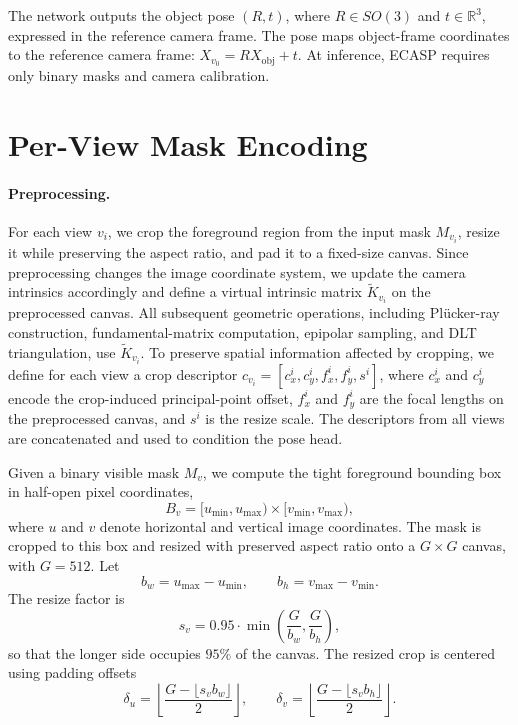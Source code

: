 The network outputs the object pose \((R,t)\), where \(R \in SO(3)\) and \(t \in \mathbb{R}^3\), expressed in the reference camera frame.
The pose maps object-frame coordinates to the reference camera frame: \(X_{v_0} = R X_{\mathrm{obj}} + t\).
At inference, ECASP requires only binary masks and camera calibration.

\section{Per-View Mask Encoding}
\label{sec:encoding}

\paragraph{Preprocessing.}
For each view \(v_i\), we crop the foreground region from the input mask \(M_{v_i}\), resize it while preserving the aspect ratio, and pad it to a fixed-size canvas.
Since preprocessing changes the image coordinate system, we update the camera intrinsics accordingly and define a virtual intrinsic matrix \(\tilde{K}_{v_i}\) on the preprocessed canvas.
All subsequent geometric operations, including Pl\"ucker-ray construction, fundamental-matrix computation, epipolar sampling, and DLT triangulation, use \(\tilde{K}_{v_i}\).
To preserve spatial information affected by cropping, we define for each view a crop descriptor \(c_{v_i}=[c_x^i,c_y^i,f_x^i,f_y^i,s^i]\), where \(c_x^i\) and \(c_y^i\) encode the crop-induced principal-point offset, \(f_x^i\) and \(f_y^i\) are the focal lengths on the preprocessed canvas, and \(s^i\) is the resize scale.
The descriptors from all views are concatenated and used to condition the pose head.


\label{supp:preprocessing}

Given a binary visible mask \(M_v\), we compute the tight foreground
bounding box in half-open pixel coordinates,
\[
B_v = [u_{\min},u_{\max}) \times [v_{\min},v_{\max}) ,
\]
where \(u\) and \(v\) denote horizontal and vertical image coordinates.
The mask is cropped to this box and resized with preserved aspect ratio
onto a \(G \times G\) canvas, with \(G=512\). Let
\[
b_w = u_{\max}-u_{\min}, \qquad
b_h = v_{\max}-v_{\min}.
\]
The resize factor is
\[
s_v = 0.95 \cdot \min\!\left(\frac{G}{b_w}, \frac{G}{b_h}\right),
\]
so that the longer side occupies \(95\%\) of the canvas. The resized crop
is centered using padding offsets
\[
\delta_u =
\left\lfloor
\frac{G-\lfloor s_v b_w \rfloor}{2}
\right\rfloor,
\qquad
\delta_v =
\left\lfloor
\frac{G-\lfloor s_v b_h \rfloor}{2}
\right\rfloor .
\]


